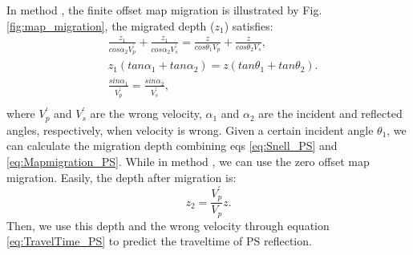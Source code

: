 \documentclass[extra,mreferee]{gji}
\newcommand{\Rome}[1]{{\bf\uppercase\expandafter{\romannumeral #1\relax}}}
\begin{document}
In method \Rome{1}, the finite offset map migration is illustrated by Fig.
\ref{fig:map_migration}, the migrated depth ($z_{1}$) satisfies:
\begin{equation}
	\begin{split}
	&\frac{z_{1}}{cos\alpha_2V^{'}_p}+\frac{z_{1}}{cos\alpha_2V^{'}_s}=\frac{z}{cos\theta_1V_p}+\frac{z}{cos\theta_2V_s},\\
	&z_{1}(tan\alpha_1+tan\alpha_2)=z(tan\theta_1+tan\theta_2).\\
	&\frac{sin\alpha_1}{V^{'}_p}=\frac{sin\alpha_2}{V^{'}_s},\\
	\end{split}
	\label{eq:Mapmigration_PS} 
\end{equation}
where $V^{'}_p$ and $V^{'}_s$ are the wrong velocity, $\alpha_1$ and $\alpha_2$ are
the incident and reflected angles, respectively, when velocity is wrong. Given a
certain incident angle $\theta_1$, we can calculate the migration depth combining eqs
\eqref{eq:Snell_PS} and \eqref{eq:Mapmigration_PS}.
While in method \Rome{2}, we can use the zero offset map migration. Easily, the depth after migration is: 
\begin{equation}
	{z_{2}}=\frac{V^{'}_p}{V_p}z.
    \label{eq:ZerooffMig_PP} 
\end{equation}
Then, we use this depth and the
wrong velocity through equation \eqref{eq:TravelTime_PS} to predict the traveltime of PS reflection.
\end{document}
